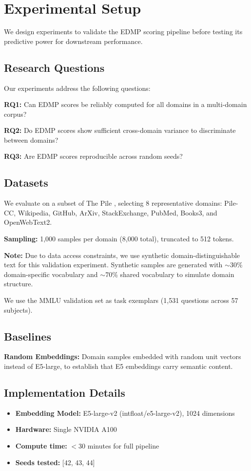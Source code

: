 \section{Experimental Setup}
\label{sec:experiments}

We design experiments to validate the EDMP scoring pipeline before testing its predictive power for downstream performance.

\subsection{Research Questions}

Our experiments address the following questions:

\textbf{RQ1:} Can EDMP scores be reliably computed for all domains in a multi-domain corpus?

\textbf{RQ2:} Do EDMP scores show sufficient cross-domain variance to discriminate between domains?

\textbf{RQ3:} Are EDMP scores reproducible across random seeds?

\subsection{Datasets}

We evaluate on a subset of The Pile \cite{gao2020pile}, selecting 8 representative domains: Pile-CC, Wikipedia, GitHub, ArXiv, StackExchange, PubMed, Books3, and OpenWebText2.

\textbf{Sampling:} 1,000 samples per domain (8,000 total), truncated to 512 tokens.

\textbf{Note:} Due to data access constraints, we use synthetic domain-distinguishable text for this validation experiment. Synthetic samples are generated with $\sim$30\% domain-specific vocabulary and $\sim$70\% shared vocabulary to simulate domain structure.

We use the MMLU validation set \cite{hendrycks2021measuring} as task exemplars (1,531 questions across 57 subjects).

\subsection{Baselines}

\textbf{Random Embeddings:} Domain samples embedded with random unit vectors instead of E5-large, to establish that E5 embeddings carry semantic content.

\subsection{Implementation Details}

\begin{itemize}
    \item \textbf{Embedding Model:} E5-large-v2 (intfloat/e5-large-v2), 1024 dimensions
    \item \textbf{Hardware:} Single NVIDIA A100
    \item \textbf{Compute time:} $<$30 minutes for full pipeline
    \item \textbf{Seeds tested:} [42, 43, 44]
\end{itemize}
